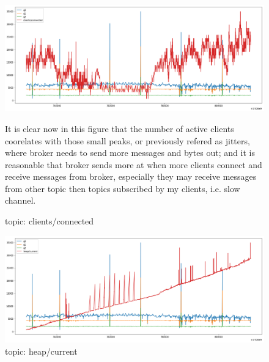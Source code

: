 \documentclass[12pt, letterpaper]{article}
\begin{document}
\begin{figure}
	\setlength{\tabcolsep}{0pt}
	\caption{topic: clients/connected}
	\label{f:valid_cnt_clients_connected}
	\begin{center}
		\includegraphics[width=\textwidth]{valid_cnt/valid_cnt-clients_connected}	
	\end{center}
	It is clear now in this figure that the number of active clients coorelates with those small peaks, or previously refered as jitters, where broker needs to send more messages and bytes out; and it is reasonable that broker sends more at when more clients connect and receive messages from broker, especially they may receive messages from other topic then topics subscribed by my clients, i.e. slow channel.
\end{figure}

\begin{figure}
	\setlength{\tabcolsep}{0pt}
	\caption{topic: heap/current}
	\label{f:valid_cnt_heap_current}
	\begin{center}
		\includegraphics[width=\textwidth]{valid_cnt/valid_cnt-heap_current}	
	\end{center}
\end{figure}
\end{document}

